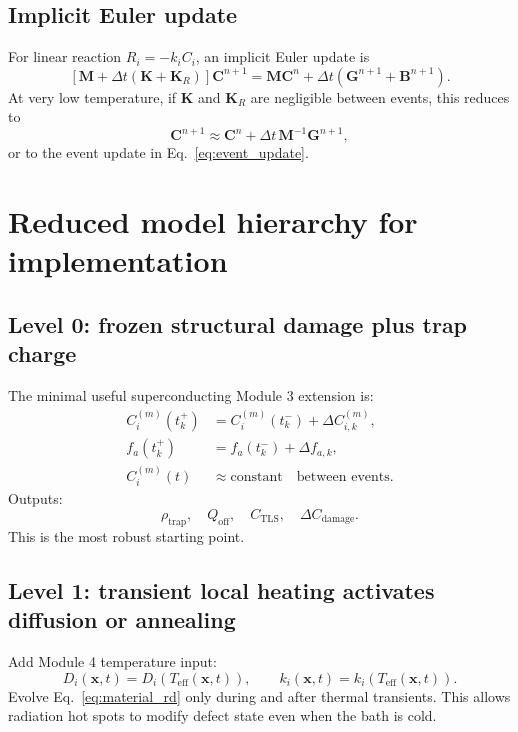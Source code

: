 \documentclass[11pt]{article}
\newcommand{\x}{\mathbf{x}}
\begin{document}
\subsection{Implicit Euler update}

For linear reaction $R_i=-k_iC_i$, an implicit Euler update is
\begin{equation}
\left[\mathbf{M}+\Delta t\left(\mathbf{K}+\mathbf{K}_{R}\right)\right]\mathbf{C}^{n+1}
=\mathbf{M}\mathbf{C}^{n}+\Delta t\left(\mathbf{G}^{n+1}+\mathbf{B}^{n+1}\right).
\label{eq:implicit_euler_m3_sc}
\end{equation}
At very low temperature, if $\mathbf{K}$ and $\mathbf{K}_R$ are negligible between events, this reduces to
\begin{equation}
\mathbf{C}^{n+1}\approx \mathbf{C}^{n}+\Delta t\,\mathbf{M}^{-1}\mathbf{G}^{n+1},
\end{equation}
or to the event update in Eq.~\eqref{eq:event_update}.

\section{Reduced model hierarchy for implementation}

\subsection{Level 0: frozen structural damage plus trap charge}

The minimal useful superconducting Module 3 extension is:
\begin{align}
C_i^{(m)}(t_k^+)&=C_i^{(m)}(t_k^-)+\Delta C_{i,k}^{(m)},\\
f_a(t_k^+)&=f_a(t_k^-)+\Delta f_{a,k},\\
C_i^{(m)}(t)&\approx \mathrm{constant}\quad \text{between events}.
\end{align}
Outputs:
\begin{equation}
\rho_{\mathrm{trap}},\quad Q_{\mathrm{off}},\quad C_{\mathrm{TLS}},\quad \Delta C_{\mathrm{damage}}.
\end{equation}
This is the most robust starting point.

\subsection{Level 1: transient local heating activates diffusion or annealing}

Add Module 4 temperature input:
\begin{equation}
D_i(\x,t)=D_i(T_{\mathrm{eff}}(\x,t)),
\qquad
k_i(\x,t)=k_i(T_{\mathrm{eff}}(\x,t)).
\end{equation}
Evolve Eq.~\eqref{eq:material_rd} only during and after thermal transients. This allows radiation hot spots to modify defect state even when the bath is cold.
\end{document}
